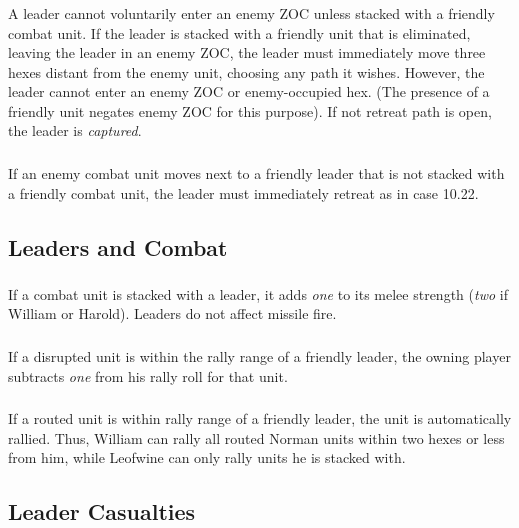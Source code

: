 \subsubsection[Enemy ZOCs]{} A leader cannot voluntarily enter an enemy ZOC unless stacked with a friendly combat unit. If the leader is stacked with a friendly unit that is eliminated, leaving the leader in an enemy ZOC, the leader must immediately move three hexes distant from the enemy unit, choosing any path it wishes. However, the leader cannot enter an enemy ZOC or enemy-occupied hex. (The presence of a friendly unit negates enemy ZOC for this purpose). If not retreat path is open, the leader is \textit{captured}.

\subsubsection[Adjacent Enemy Units]{} If an enemy combat unit moves next to a friendly leader that is not stacked with a friendly combat unit, the leader must immediately retreat as in case 10.22.

\subsection{Leaders and Combat}

\subsubsection[Strength]{} If a combat unit is stacked with a leader, it adds \textit{one} to its melee strength (\textit{two} if William or Harold). Leaders do not affect missile fire.

\subsubsection[Disrupted Unit]{} If a disrupted unit is within the rally range of a friendly leader, the owning player subtracts \textit{one} from his rally roll for that unit.

\subsubsection[Routed Unit]{} If a routed unit is within rally range of a friendly leader, the unit is automatically rallied. Thus, William can rally all routed Norman units within two hexes or less from him, while Leofwine can only rally units he is stacked with.

\subsection{Leader Casualties}

